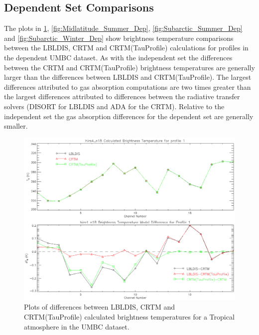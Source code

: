 \subsection{Dependent Set Comparisons}

The plots in \ref{fig:Tropical_Dep}, \ref{fig:Midlatitude_Summer_Dep}, \ref{fig:Subarctic_Summer_Dep} and \ref{fig:Subarctic_Winter_Dep} show brightness temperature comparisons between the LBLDIS, CRTM and CRTM(TauProfile) calculations for profiles in the dependent UMBC dataset. As with the independent set the differences
between the CRTM and CRTM(TauProfile) brightness temperatures are generally larger than the differences between LBLDIS and CRTM(TauProfile). The largest differences
attributed to gas absorption computations are two times greater than the largest differences attributed to differences between the radiative transfer solvers (DISORT for LBLDIS and ADA for the CRTM). Relative to the independent set the gas absorption differences for the dependent set are generally smaller. 

\begin{figure}[htp]
  \centering{}
  \includegraphics[scale=0.8]{./graphics/Tropical_01.eps}
  \caption{Plots of differences between LBLDIS, CRTM and CRTM(TauProfile) calculated brightness temperatures for
   a Tropical atmosphere in the UMBC dataset.}
  \label{fig:Tropical_Dep}
\end{figure}

